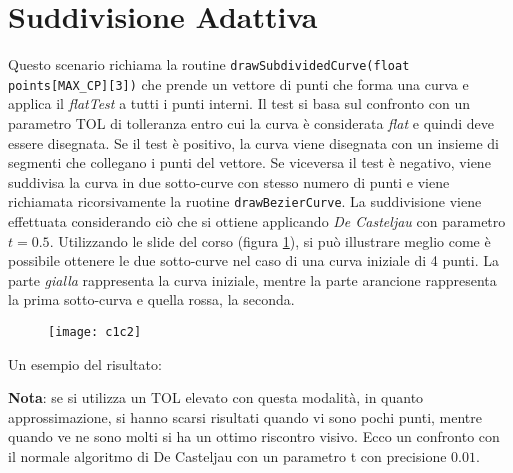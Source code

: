 \section{Suddivisione Adattiva}
Questo scenario richiama la routine \texttt{drawSubdividedCurve\-(float points[MAX\_CP][3])} che prende un vettore di punti che forma una curva e applica il \textit{flatTest} a tutti i punti interni. Il test si basa sul confronto con un parametro TOL di tolleranza entro cui la curva è considerata \textit{flat} e quindi deve essere disegnata. Se il test è positivo, la curva viene disegnata con un insieme di segmenti che collegano i punti del vettore. Se viceversa il test è negativo, viene suddivisa la curva in due sotto-curve con stesso numero di punti e viene richiamata ricorsivamente la ruotine \texttt{drawBezierCurve}. La suddivisione viene effettuata considerando ciò che si ottiene applicando \textit{De Casteljau} con parametro $t=0.5$. Utilizzando le slide del corso (figura \ref{fig:c1c2}), si può illustrare meglio come è possibile ottenere le due sotto-curve nel caso di una curva iniziale di 4 punti. La parte \textit{gialla} rappresenta la curva iniziale, mentre la parte arancione rappresenta la prima sotto-curva e quella rossa, la seconda.


 \begin{figure}[htb]
    \centering
    \vspace{-0.3cm}
    \texttt{[image: c1c2]}
    \caption{\label{fig:c1c2}}
    \vspace{-0.3cm}
\end{figure}

Un esempio del risultato:
\begin{figure}[hbt]
    \centering

\end{figure}

\textbf{Nota}: se si utilizza un TOL elevato con questa modalità, in quanto approssimazione, si hanno scarsi risultati quando vi sono pochi punti, mentre quando ve ne sono molti si ha un ottimo riscontro visivo. Ecco un confronto con il normale algoritmo di De Casteljau con un parametro t con precisione $0.01$.

\begin{figure}[hbt]
    \centering
	\vspace{-0.3cm}
\end{figure}

